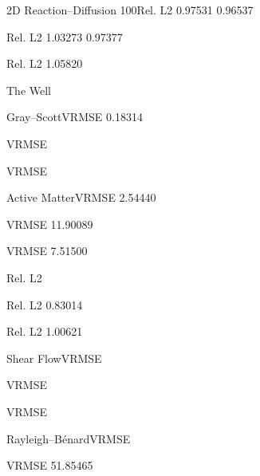 \documentclass[11pt]{article}
\begin{document}
\noindent 2D Reaction–Diffusion 100\quad Rel. L2 0.97531  0.96537\par


\quad Rel. L2 1.03273  0.97377\par


\quad Rel. L2 1.05820\par

The Well

\noindent Gray–Scott\quad VRMSE  0.18314\par


\quad VRMSE\par


\quad VRMSE\par


\noindent Active Matter\quad VRMSE  2.54440\par


\quad VRMSE 11.90089\par


\quad VRMSE  7.51500\par


\quad Rel. L2\par


\quad Rel. L2  0.83014\par


\quad Rel. L2  1.00621\par


\noindent Shear Flow\quad VRMSE\par


\quad VRMSE\par


\quad VRMSE\par


\noindent Rayleigh–Bénard\quad VRMSE\par


\quad VRMSE  51.85465\par
\end{document}
